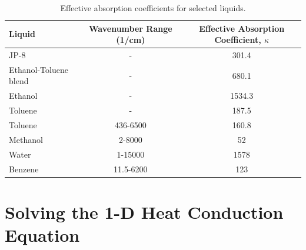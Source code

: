 \begin{table}[ht]
\caption[Effective absorption coefficients for selected liquids]{Effective absorption coefficients for selected liquids.}
\centering
\begin{tabular}{l c c}
\hline\hline
Liquid                                              & Wavenumber Range (\si{1/\cm})  & Effective Absorption Coefficient, $\kappa$ 
  \\ \hline
JP-8 \cite{Suo-Anttila:PCT2009}                     &  -                             & 301.4                                      
  \\
Ethanol-Toluene blend \cite{Suo-Anttila:PCT2009}    &  -                             & 680.1                                      
  \\
Ethanol \cite{Suo-Anttila:PCT2009}                  &  -                             & 1534.3                                     
  \\
Toluene \cite{Suo-Anttila:PCT2009}                  &  -                             & 187.5                                      
  \\
Toluene \cite{Bertie:AS1994a}                       &  436-6500                      & 160.8                                      
  \\
Methanol\cite{Bertie:AS1993a}                       &  2-8000                        & 52                                         
  \\
Water   \cite{Bertie:AS1996}                        &  1-15000                       & 1578                                       
  \\
Benzene \cite{Bertie:AS1993b}                       &  11.5-6200                     & 123                                        
  \\ \hline
\end{tabular}
\label{tbl_abscoeff}
\end{table}




\chapter{Solving the 1-D Heat Conduction Equation}
\label{solid-phase-discretization}


